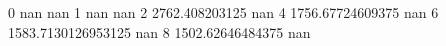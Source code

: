 0 nan nan
1 nan nan
2 2762.408203125 nan
4 1756.67724609375 nan
6 1583.7130126953125 nan
8 1502.62646484375 nan

